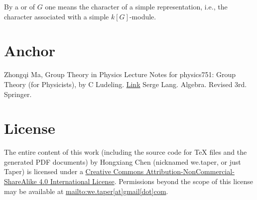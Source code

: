 \documentclass{article}
\begin{document}
By a  or  of $G$ one means
the character of a simple representation, i.e., the character
associated with a simple $k[G]$-module.






\section{Anchor}
\label{sec:Anchor}

\begin{thebibliography}{1}
     Zhongqi Ma, Group Theory in Physics
     Lecture Notes for physics751: Group Theory (for
    Physicists), by C Ludeling.
    \href{http://www.th.physik.uni-bonn.de/nilles/people/luedeling/grouptheory/data/grouptheorynotes.pdf}{Link}
     Serge Lang. Algebra. Revised 3rd. Springer.
\end{thebibliography}
\section{License}
The entire content of this work (including the source code
for TeX files and the generated PDF documents) by 
Hongxiang Chen (nicknamed we.taper, or just Taper) is
licensed under a 
\href{http://creativecommons.org/licenses/by-nc-sa/4.0/}{Creative 
Commons Attribution-NonCommercial-ShareAlike 4.0 International 
License}. Permissions beyond the scope of this 
license may be available at \url{mailto:we.taper[at]gmail[dot]com}.


\printnomenclature
\end{document}
